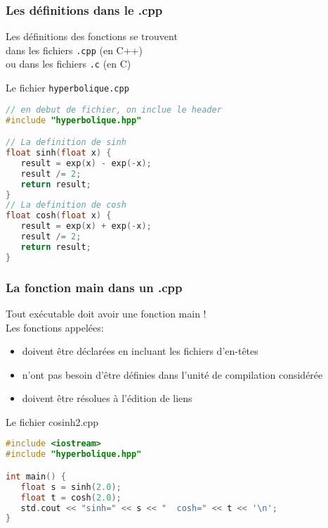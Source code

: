 \documentclass{beamer}
\begin{document}
\begin{frame}[fragile=singleslide,shrink=20]
\frametitle{Les définitions dans le .cpp}
Les définitions des fonctions se trouvent \\
dans les fichiers \texttt{.cpp} (en C++) \\
ou dans les fichiers \texttt{.c} (en C)

\begin{block}{Le fichier \texttt{hyperbolique.cpp}}
\begin{lstlisting}[language=c++]
// en debut de fichier, on inclue le header
#include "hyperbolique.hpp"

// La definition de sinh
float sinh(float x) {
   result = exp(x) - exp(-x);
   result /= 2;
   return result;
}
// La definition de cosh
float cosh(float x) {
   result = exp(x) + exp(-x);
   result /= 2;
   return result;
}

\end{lstlisting}
\end{block}
\end{frame}

\begin{frame}[fragile=singleslide,shrink=20]
\frametitle{La fonction main dans un .cpp}
Tout exécutable doit avoir une fonction main ! \\
Les fonctions appelées:
\begin{itemize}
\item{doivent être déclarées en incluant les fichiers d'en-têtes}
\item{n'ont pas besoin d'être définies dans l'unité de compilation considérée}
\item{doivent être résolues à l'édition de liens}
\end{itemize}

\begin{block}{Le fichier cosinh2.cpp}
\begin{lstlisting}[language=c++]
#include <iostream>
#include "hyperbolique.hpp"

int main() {
   float s = sinh(2.0);
   float t = cosh(2.0);
   std.cout << "sinh=" << s << "  cosh=" << t << '\n';
}
\end{lstlisting}
\end{block}
\end{frame}
\end{document}

